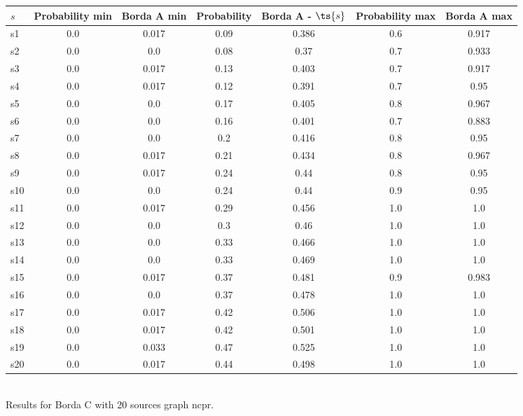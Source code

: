 \documentclass{article}
\begin{document}
\noindent\begin{tabular}{|l|c|c|c|c|c|c|}
\hline
$s$& Probability min & Borda A min & Probability & Borda A - $\ts{s}$ & Probability max & Borda A max\\
\hline
s1 &0.0 & 0.017 & 0.09 & 0.386 & 0.6 & 0.917\\
\hline
s2 &0.0 & 0.0 & 0.08 & 0.37 & 0.7 & 0.933\\
\hline
s3 &0.0 & 0.017 & 0.13 & 0.403 & 0.7 & 0.917\\
\hline
s4 &0.0 & 0.017 & 0.12 & 0.391 & 0.7 & 0.95\\
\hline
s5 &0.0 & 0.0 & 0.17 & 0.405 & 0.8 & 0.967\\
\hline
s6 &0.0 & 0.0 & 0.16 & 0.401 & 0.7 & 0.883\\
\hline
s7 &0.0 & 0.0 & 0.2 & 0.416 & 0.8 & 0.95\\
\hline
s8 &0.0 & 0.017 & 0.21 & 0.434 & 0.8 & 0.967\\
\hline
s9 &0.0 & 0.017 & 0.24 & 0.44 & 0.8 & 0.95\\
\hline
s10 &0.0 & 0.0 & 0.24 & 0.44 & 0.9 & 0.95\\
\hline
s11 &0.0 & 0.017 & 0.29 & 0.456 & 1.0 & 1.0\\
\hline
s12 &0.0 & 0.0 & 0.3 & 0.46 & 1.0 & 1.0\\
\hline
s13 &0.0 & 0.0 & 0.33 & 0.466 & 1.0 & 1.0\\
\hline
s14 &0.0 & 0.0 & 0.33 & 0.469 & 1.0 & 1.0\\
\hline
s15 &0.0 & 0.017 & 0.37 & 0.481 & 0.9 & 0.983\\
\hline
s16 &0.0 & 0.0 & 0.37 & 0.478 & 1.0 & 1.0\\
\hline
s17 &0.0 & 0.017 & 0.42 & 0.506 & 1.0 & 1.0\\
\hline
s18 &0.0 & 0.017 & 0.42 & 0.501 & 1.0 & 1.0\\
\hline
s19 &0.0 & 0.033 & 0.47 & 0.525 & 1.0 & 1.0\\
\hline
s20 &0.0 & 0.017 & 0.44 & 0.498 & 1.0 & 1.0\\
\hline
\end{tabular}\\

\noindent Results for Borda C with 20 sources graph ncpr.
\end{document}
